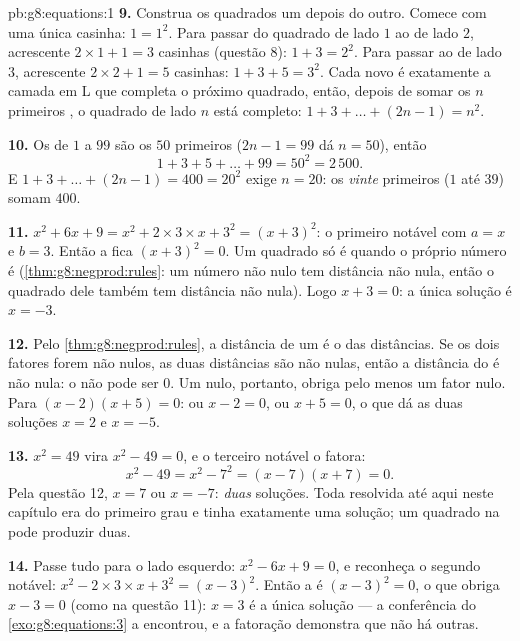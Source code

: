 \begin{solution}{pb:g8:equations:1}
\textbf{9.} Construa os quadrados um depois do outro. Comece com uma
única casinha: $1 = 1^2$. Para passar do quadrado de lado $1$ ao de
lado $2$, acrescente $2 \times 1 + 1 = 3$ casinhas (questão 8):
$1 + 3 = 2^2$. Para passar ao de lado $3$, acrescente
$2 \times 2 + 1 = 5$ casinhas: $1 + 3 + 5 = 3^2$. Cada 
novo é exatamente a camada em L que completa o próximo quadrado, então,
depois de somar os $n$ primeiros , o quadrado de lado $n$ está
completo: $1 + 3 + \dots + (2n - 1) = n^2$.

\textbf{10.} Os  de $1$ a $99$ são os $50$ primeiros
($2n - 1 = 99$ dá $n = 50$), então
\[
1 + 3 + 5 + \dots + 99 = 50^2 = 2\,500 .
\]
E $1 + 3 + \dots + (2n - 1) = 400 = 20^2$ exige $n = 20$: os
\emph{vinte} primeiros  ($1$ até $39$) somam $400$.

\textbf{11.} $x^2 + 6x + 9 = x^2 + 2 \times 3 \times x + 3^2 =
(x + 3)^2$: o primeiro  notável com $a = x$ e $b = 3$. Então a
 fica $(x + 3)^2 = 0$. Um quadrado só é  quando o próprio
número é  (\cref{thm:g8:negprod:rules}: um número não nulo tem
distância não nula, então o quadrado dele também tem distância não
nula). Logo $x + 3 = 0$: a única solução é $x = -3$.

\textbf{12.} Pelo \cref{thm:g8:negprod:rules}, a distância de um
 é o  das distâncias. Se os dois fatores forem não nulos,
as duas distâncias são não nulas, então a distância do  é não
nula: o  não pode ser $0$. Um  nulo, portanto, obriga
pelo menos um fator nulo. Para $(x - 2)(x + 5) = 0$: ou $x - 2 = 0$, ou
$x + 5 = 0$, o que dá as duas soluções $x = 2$ e $x = -5$.

\textbf{13.} $x^2 = 49$ vira $x^2 - 49 = 0$, e o terceiro 
notável o fatora:
\[
x^2 - 49 = x^2 - 7^2 = (x - 7)(x + 7) = 0 .
\]
Pela questão 12, $x = 7$ ou $x = -7$: \emph{duas} soluções. Toda
 resolvida até aqui neste capítulo era do primeiro grau e tinha
exatamente uma solução; um quadrado na  pode produzir duas.

\textbf{14.} Passe tudo para o lado esquerdo: $x^2 - 6x + 9 = 0$, e
reconheça o segundo  notável:
$x^2 - 2 \times 3 \times x + 3^2 = (x - 3)^2$. Então a  é
$(x - 3)^2 = 0$, o que obriga $x - 3 = 0$ (como na questão 11):
$x = 3$ é a única solução --- a conferência do
\cref{exo:g8:equations:3} a encontrou, e a fatoração demonstra que não
há outras.


\end{solution}
